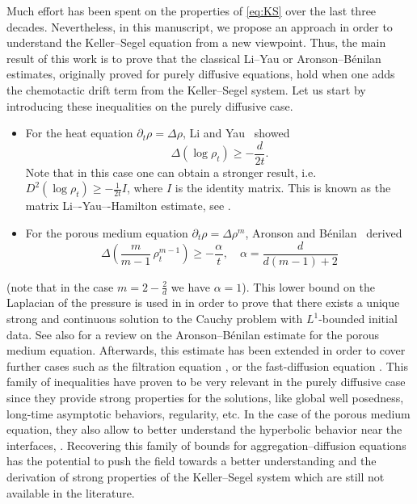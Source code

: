 \documentclass[11pt,a4paper]{article}
\numberwithin{equation}{section}
\theoremstyle{plain}
\theoremstyle{remark}
\newcounter{review}
\begin{document}
\medskip

Much effort has been spent on the properties of \eqref{eq:KS} over the last three decades. Nevertheless, in this manuscript, we propose an approach in order to understand the Keller--Segel equation from a new viewpoint. 
Thus, the main result of this work is to prove that the classical Li--Yau or Aronson--B\'enilan estimates,  originally proved for purely diffusive equations, hold when one adds the chemotactic drift term from the Keller--Segel system. Let us start by introducing these inequalities on the purely diffusive case.

\begin{itemize}
\item For the heat equation $\partial_t\rho = \Delta\rho$, Li and Yau~\cite{Li_Yau86, Yau94} showed
\[
\Delta \left(\log\rho_t \right)   \ge -\frac{d}{2t}.
\]
Note that in this case one can obtain a stronger result, i.e. $D^2\left(\log\rho_t \right)   \ge -\frac{1}{2t}I$, where $I$ is the identity matrix. This is known as the matrix Li–-Yau–-Hamilton estimate, see \cite{Li_Yau86, Hamilton93}.
\item For the porous medium equation $\partial_t\rho = \Delta\rho^m$, Aronson and B\'enilan~\cite{Aronson70, Aronson_Benilan79} derived
\[
\Delta  \left(\frac{m}{m-1}\,\rho^{m-1}_t \right)
     \ge 
   -\frac{\alpha}{\,t\,},
   \quad
   \alpha  = \frac{d}{d(m-1)+2}
\]
\end{itemize}
(note that in the case $m=2-\frac 2d$ we have $\alpha=1$). This lower bound on the Laplacian of the pressure is used in \cite{Aronson_Benilan79} in order to prove that there exists a
unique strong and continuous solution to the Cauchy problem with $L^1$-bounded initial data. See also \cite[Chapter 9]{Vazquez06} for a review on the Aronson--B\'enilan estimate for the porous medium equation. Afterwards, this estimate has been extended in order to cover further cases such as the filtration equation \cite{Crandall_Pierre82}, or the fast-diffusion equation \cite{%
Vazquez06, Bonforte_Figalli24}. This family of inequalities have proven to be very relevant in the purely diffusive case since they provide strong properties for the solutions, like global well posedness, long-time asymptotic behaviors, regularity, etc. In the case of the porous medium equation, they also allow to better understand the hyperbolic behavior near the interfaces, \cite[Chapter 9]{Vazquez06}. Recovering this family of bounds for aggregation--diffusion equations has the potential to push the field towards a better understanding and the derivation of strong properties of the Keller--Segel system which are still not available in the literature. 
\end{document}

